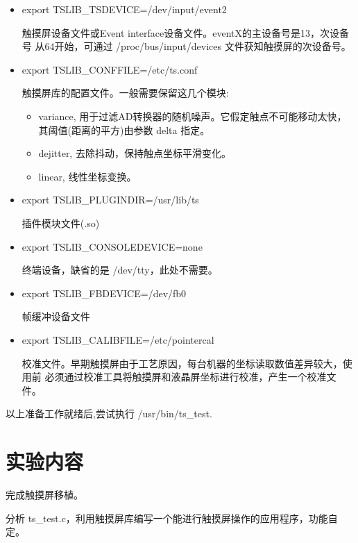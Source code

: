 \begin{itemize}
  \item export TSLIB\_TSDEVICE=/dev/input/event2

	触摸屏设备文件或Event interface设备文件。eventX的主设备号是13，次设备号
从64开始，可通过 /proc/bus/input/devices 文件获知触摸屏的次设备号。
  \item export TSLIB\_CONFFILE=/etc/ts.conf         

	触摸屏库的配置文件。一般需要保留这几个模块:
  \begin{itemize}
    \item variance, 用于过滤AD转换器的随机噪声。它假定触点不可能移动太快，
	其阈值(距离的平方)由参数 delta 指定。
    \item dejitter, 去除抖动，保持触点坐标平滑变化。
    \item linear, 线性坐标变换。
  \end{itemize}
  \item export TSLIB\_PLUGINDIR=/usr/lib/ts

	插件模块文件(.so)
  \item export TSLIB\_CONSOLEDEVICE=none

	终端设备，缺省的是 /dev/tty，此处不需要。
  \item export TSLIB\_FBDEVICE=/dev/fb0

	帧缓冲设备文件
  \item export TSLIB\_CALIBFILE=/etc/pointercal

	校准文件。早期触摸屏由于工艺原因，每台机器的坐标读取数值差异较大，使用前
必须通过校准工具将触摸屏和液晶屏坐标进行校准，产生一个校准文件。
\end{itemize}

	以上准备工作就绪后,尝试执行 /usr/bin/ts\_test.

\section{实验内容}
	完成触摸屏移植。

	分析 ts\_test.c，利用触摸屏库编写一个能进行触摸屏操作的应用程序，功能自定。
